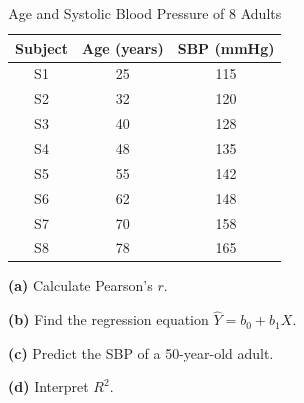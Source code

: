 \documentclass[
  12pt,
  letterpaper,
]{book}
\begin{document}
\begin{longtable}[t]{ccc}

\caption{\label{tbl-ex1-data}Age and Systolic Blood Pressure of 8
Adults}

\tabularnewline

\toprule
Subject & Age (years) & SBP (mmHg)\\
\midrule
S1 & 25 & 115\\
S2 & 32 & 120\\
S3 & 40 & 128\\
S4 & 48 & 135\\
S5 & 55 & 142\\
\addlinespace
S6 & 62 & 148\\
S7 & 70 & 158\\
S8 & 78 & 165\\
\bottomrule

\end{longtable}

\endgroup{}

\textbf{(a)} Calculate Pearson's \(r\).

\textbf{(b)} Find the regression equation \(\hat{Y} = b_0 + b_1 X\).

\textbf{(c)} Predict the SBP of a 50-year-old adult.

\textbf{(d)} Interpret \(R^2\).
\end{document}
